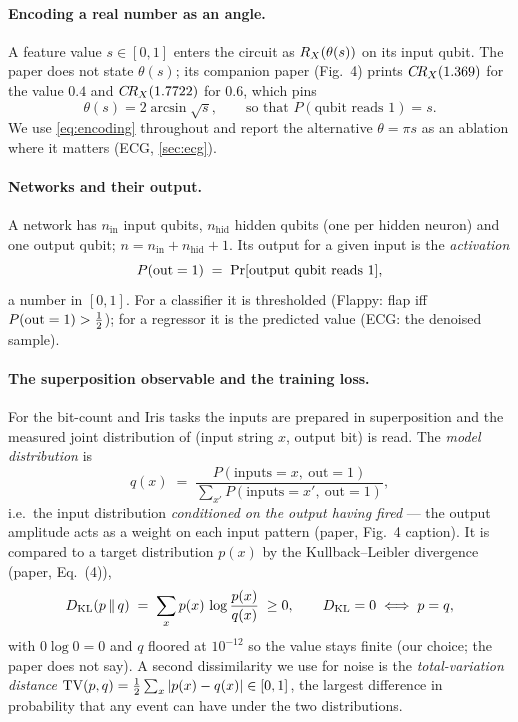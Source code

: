 \paragraph{Encoding a real number as an angle.}
A feature value $s\in[0,1]$ enters the circuit as $R_X(\theta(s))$ on its input qubit.  The paper
does not state $\theta(s)$; its companion paper \cite{snn} (Fig.~4) prints
$C\!R_X(1.369)$ for the value $0.4$ and $C\!R_X(1.7722)$ for $0.6$, which pins
\begin{equation}
\theta(s) = 2\arcsin\sqrt{s}, \qquad\text{so that } P(\text{qubit reads } 1) = s .
\label{eq:encoding}
\end{equation}
We use \cref{eq:encoding} throughout and report the alternative $\theta = \pi s$ as an ablation
where it matters (ECG, \cref{sec:ecg}).

\paragraph{Networks and their output.}
A network has $n_{\mathrm{in}}$ input qubits, $n_{\mathrm{hid}}$ hidden qubits (one per hidden
neuron) and one output qubit; $n = n_{\mathrm{in}}+n_{\mathrm{hid}}+1$.  Its output for a given
input is the \emph{activation}
\begin{equation}
P(\mathrm{out}=1) \;=\; \Pr[\text{output qubit reads }1],
\end{equation}
a number in $[0,1]$.  For a classifier it is thresholded (Flappy: flap iff $P(\mathrm{out}=1)>\tfrac12$);
for a regressor it is the predicted value (ECG: the denoised sample).

\paragraph{The superposition observable and the training loss.}
For the bit-count and Iris tasks the inputs are prepared in superposition and the measured joint
distribution of (input string $x$, output bit) is read.  The \emph{model distribution} is
\begin{equation}
q(x) \;=\; \frac{P(\text{inputs}=x,\ \mathrm{out}=1)}{\sum_{x'} P(\text{inputs}=x',\ \mathrm{out}=1)},
\label{eq:model-distribution}
\end{equation}
i.e.\ the input distribution \emph{conditioned on the output having fired} --- the output
amplitude acts as a weight on each input pattern (paper, Fig.~4 caption).  It is compared to a
target distribution $p(x)$ by the Kullback--Leibler divergence (paper, Eq.~(4)),
\begin{equation}
D_{\mathrm{KL}}(p\,\|\,q) \;=\; \sum_x p(x)\,\log\frac{p(x)}{q(x)} \;\ge 0,
\qquad D_{\mathrm{KL}} = 0 \iff p = q,
\label{eq:kl}
\end{equation}
with $0\log 0 = 0$ and $q$ floored at $10^{-12}$ so the value stays finite (our choice; the paper
does not say).  A second dissimilarity we use for noise is the \emph{total-variation distance}
$\mathrm{TV}(p,q) = \tfrac12\sum_x |p(x)-q(x)| \in [0,1]$, the largest difference in probability that any
event can have under the two distributions.

